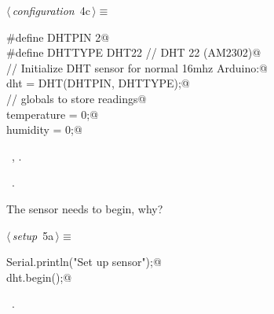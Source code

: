 \documentclass[a4paper, 12pt]{article}
\begin{document}
\begin{flushleft} \small
\begin{minipage}{\linewidth}\label{scrap3}\raggedright\small
{}$\langle\,${\itshape configuration}\nobreak\ {\footnotesize{4c}}$\,\rangle\equiv$
\vspace{-1ex}
\begin{list}{}{\setlength{\leftmargin}{1em}} \item
\mbox{}\verb@#define DHTPIN 2@\\
\mbox{}\verb@#define DHTTYPE DHT22   // DHT 22  (AM2302)@\\
\mbox{}\verb@// Initialize DHT sensor for normal 16mhz Arduino:@\\
\mbox{}\verb@DHT dht = DHT(DHTPIN, DHTTYPE);@\\
\mbox{}\verb@// globals to store readings@\\
\mbox{}\verb@float temperature = 0;@\\
\mbox{}\verb@float humidity = 0;@\\
\mbox{}{\NWsep}
\end{list}
\vspace{-1ex}
\vspace{-1ex}
\footnotesize
\begin{list}{}{\setlength{\itemsep}{-\parsep}\setlength{\itemindent}{-\leftmargin}}
\item \NWtxtMacroDefBy\ , .
\item \NWtxtMacroRefIn\ .
\end{list}
\end{minipage}
\end{flushleft}

The sensor needs to begin, why?

\begin{flushleft} \small
\begin{minipage}{\linewidth}\label{scrap4}\raggedright\small
{}$\langle\,${\itshape setup}\nobreak\ {\footnotesize{5a}}$\,\rangle\equiv$
\vspace{-1ex}
\begin{list}{}{\setlength{\leftmargin}{1em}} \item
\mbox{}\verb@  Serial.println("Set up sensor");@\\
\mbox{}\verb@  dht.begin();@\\
\mbox{}{\NWsep}
\end{list}
\vspace{-1ex}
\vspace{-1ex}
\footnotesize
\begin{list}{}{\setlength{\itemsep}{-\parsep}\setlength{\itemindent}{-\leftmargin}}
\item \NWtxtMacroRefIn\ .
\end{list}
\end{minipage}
\end{flushleft}
\end{document}
